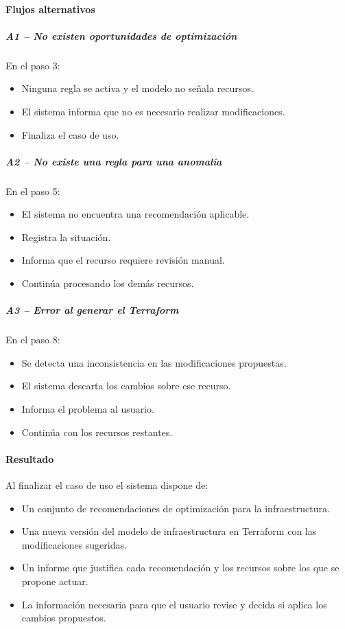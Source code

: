 \paragraph*{Flujos alternativos}

\subparagraph{A1 -- No existen oportunidades de optimización}

En el paso 3:

\begin{itemize}
\item Ninguna regla se activa y el modelo no señala recursos.
\item El sistema informa que no es necesario realizar modificaciones.
\item Finaliza el caso de uso.
\end{itemize}

\subparagraph{A2 -- No existe una regla para una anomalía}

En el paso 5:

\begin{itemize}
\item El sistema no encuentra una recomendación aplicable.
\item Registra la situación.
\item Informa que el recurso requiere revisión manual.
\item Continúa procesando los demás recursos.
\end{itemize}

\subparagraph{A3 -- Error al generar el Terraform}

En el paso 8:

\begin{itemize}
\item Se detecta una inconsistencia en las modificaciones propuestas.
\item El sistema descarta los cambios sobre ese recurso.
\item Informa el problema al usuario.
\item Continúa con los recursos restantes.
\end{itemize}

\paragraph*{Resultado}

Al finalizar el caso de uso el sistema dispone de:

\begin{itemize}
\item Un conjunto de recomendaciones de optimización para la infraestructura.
\item Una nueva versión del modelo de infraestructura en Terraform con las modificaciones sugeridas.
\item Un informe que justifica cada recomendación y los recursos sobre los que se propone actuar.
\item La información necesaria para que el usuario revise y decida si aplica los cambios propuestos.
\end{itemize}

